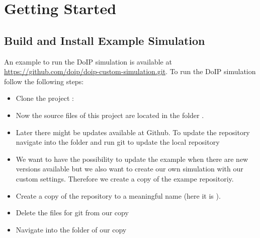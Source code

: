 \documentclass[a4paper]{doipdoc}
\begin{document}
\section{Getting Started}

	\subsection{Build and Install Example Simulation}

		An example to run the DoIP simulation is available at 
		\url{https://github.com/doip/doip-custom-simulation.git}.
		To run the DoIP simulation follow the following steps:

		\begin{itemize}
			\item Clone the project :


			\item Now the source files of this project are located in the
			folder . 

			\item Later there might be updates available at Github. To 
			update the repository navigate into the folder 
			 and run git to update the local
			repository


			\item We want to have the possibility to update the example 
			when there are new versions available but we also want
			to create our own simulation with our custom settings. Therefore
			we create a copy of the exampe repositoriy.
			
			\item Create a copy of the repository to a meaningful name (here
				it is ).


			\item Delete the files for git from our copy


			\item Navigate into the folder of our copy



\end{itemize}
\end{document}
